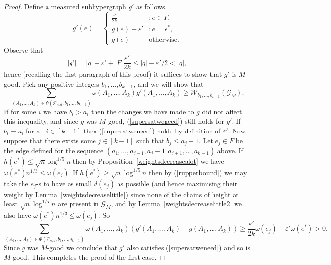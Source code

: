 \documentclass[12pt]{article}
\numberwithin{equation}{section}
\def\G{\mathcal{G}}
\def\P{\mathcal{P}}
\def\W{\mathcal{W}}
\def\w{\omega}
\def\eps{\varepsilon}
\begin{document}
\begin{proof}
Define a measured subhypergraph $g'$ as follows.
\[
g'(e)=
\left\{
\begin{array}
{ll}
\frac{\eps'}{2k}  & : e\in F, \\
g(e)-\eps'  & : e=e^*, \\
g(e) & \text{otherwise.}
\end{array}
\right.
\]
Observe that $$|g'|=|g|-\eps' + |F|\frac{\eps'}{2k}\leq |g|-\eps'/2<|g|,$$
hence (recalling the first paragraph of this proof) it suffices to show that $g'$ is $M$-good. Pick any positive integers $b_1,\ldots,b_{k-1}$, and we will show that
\begin{equation}\label{supersatweneed}\sum_{(A_1,\ldots,A_k)\in\Phi(\P_{n,d},b_1,\ldots,b_{k-1})}\w(A_1,\ldots,A_k)g'(A_1,\ldots,A_k)\geq \W_{b_1,\ldots,b_{k-1}}(\G_M).
\end{equation}
 If for some $i$ we have $b_i>a_i$ then the changes we have made to $g$ did not affect this inequality, and
since $g$ was $M$-good, (\ref{supersatweneed}) still holds for $g'$. If $b_i=a_i$ for all $i\in [k-1]$ then (\ref{supersatweneed}) holds by definition of $\eps'$. Now suppose that there exists some $j\in [k-1]$ such that $b_j\leq a_j-1$. Let $e_j\in F$ be the edge defined for the sequence $(a_1,\ldots,a_{j-1},a_j-1,a_{j+1},\ldots,a_{k-1})$  above. If $h(e^*)\leq \sqrt{n}\log^{1/5}n$ then by Proposition~\ref{weightsdecreasealot} we have $\w(e^*)n^{1/3}\leq \w(e_j)$. If $h(e^*)\geq \sqrt{n}\log^{1/5}n$ then by (\ref{rupperbound}) we may take the $e_j$-s to have as small $d(e_j)$ as possible (and hence maximising their weight by Lemma~\ref{weightsdecreaselittle}) since none of the chains of height at least $\sqrt{n}\log^{1/5}n$ are present in $\G_M$, and by Lemma~\ref{weightsdecreaselittle2} we also have $\w(e^*)n^{1/3}\leq \w(e_j)$. So
$$\sum_{(A_1,\ldots,A_k)\in\Phi(\P_{n,d},b_1,\ldots,b_{k-1})}\w(A_1,\ldots,A_k)\left(g'(A_1,\ldots,A_k) - g(A_1,\ldots,A_k)\right)\geq  \frac{\eps'}{2k}\w(e_j) - \eps' \w(e^*)>0.$$
Since $g$ was $M$-good we conclude that $g'$ also satisfies (\ref{supersatweneed}) and so is $M$-good. This completes the proof of the first case.


\end{proof}
\end{document}
